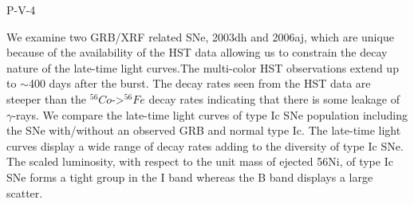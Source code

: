 P-V-4


\bigskip



\bigskip

\noindent We examine two GRB/XRF related SNe, 2003dh and 2006aj, which are unique because of the availability of the HST data allowing us to constrain the decay nature of the late-time light curves.The multi-color HST observations extend up to $\sim$400 days after the burst. The decay rates seen from the HST data are steeper than the $^{56}Co$->$^{56}Fe$ decay rates indicating that there is some leakage of $\gamma$-rays. We compare the late-time light curves of type Ic SNe population including the SNe with/without an observed GRB and normal type Ic. The late-time light curves display a wide range of decay rates adding to the diversity of type Ic SNe. The scaled luminosity, with respect to the unit mass of ejected 56Ni, of type Ic SNe forms a tight group in the I band whereas the B band displays a large scatter.

